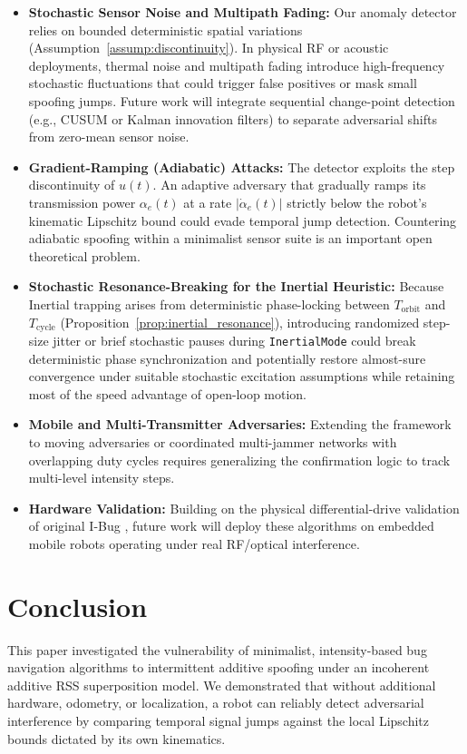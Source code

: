 \documentclass[12pt, a4paper]{article}
\begin{document}
\begin{itemize}
    \item \textbf{Stochastic Sensor Noise and Multipath Fading:} Our anomaly detector relies on bounded deterministic spatial variations (Assumption~\ref{assump:discontinuity}). In physical RF or acoustic deployments, thermal noise and multipath fading introduce high-frequency stochastic fluctuations that could trigger false positives or mask small spoofing jumps. Future work will integrate sequential change-point detection (e.g., CUSUM \cite{basseville1993detection} or Kalman innovation filters) to separate adversarial shifts from zero-mean sensor noise.
    
    \item \textbf{Gradient-Ramping (Adiabatic) Attacks:} The detector exploits the step discontinuity of $u(t)$. An adaptive adversary that gradually ramps its transmission power $\alpha_e(t)$ at a rate $|\dot{\alpha}_e(t)|$ strictly below the robot's kinematic Lipschitz bound could evade temporal jump detection. Countering adiabatic spoofing within a minimalist sensor suite is an important open theoretical problem.
    
    \item \textbf{Stochastic Resonance-Breaking for the Inertial Heuristic:} Because Inertial trapping arises from deterministic phase-locking between $T_{\text{orbit}}$ and $T_{\text{cycle}}$ (Proposition~\ref{prop:inertial_resonance}), introducing randomized step-size jitter or brief stochastic pauses during \texttt{InertialMode} could break deterministic phase synchronization and potentially restore almost-sure convergence under suitable stochastic excitation assumptions while retaining most of the speed advantage of open-loop motion.
    
    \item \textbf{Mobile and Multi-Transmitter Adversaries:} Extending the framework to moving adversaries or coordinated multi-jammer networks with overlapping duty cycles requires generalizing the confirmation logic to track multi-level intensity steps.
    
    \item \textbf{Hardware Validation:} Building on the physical differential-drive validation of original I-Bug \cite{taylor2014intensity}, future work will deploy these algorithms on embedded mobile robots operating under real RF/optical interference.
\end{itemize}

\section{Conclusion}
\label{sec:conclusion}
This paper investigated the vulnerability of minimalist, intensity-based bug navigation algorithms to intermittent additive spoofing under an incoherent additive RSS superposition model. We demonstrated that without additional hardware, odometry, or localization, a robot can reliably detect adversarial interference by comparing temporal signal jumps against the local Lipschitz bounds dictated by its own kinematics.
\end{document}
